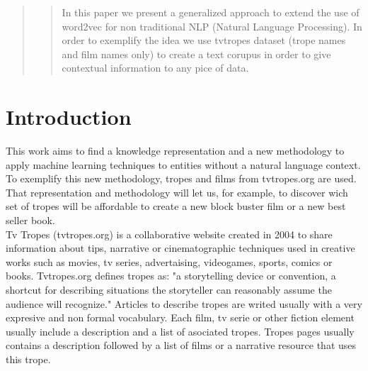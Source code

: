 \documentclass[letterpaper]{article}
\begin{document}
 
	\begin{abstract}
		\begin{quote}
			In this paper we present a generalized approach to extend the use of word2vec for non traditional NLP (Natural Language Processing). In order to exemplify the idea we use tvtropes dataset (trope names and film names only) to create a text corupus in order to give contextual information to any pice of data.
		\end{quote}
	\end{abstract}
	
	
	
	
	
	\section{Introduction}
	
	
	This work aims to find a knowledge representation and a new methodology to apply machine learning techniques to entities without a natural language context. To exemplify this new methodology, tropes and films from tvtropes.org are used. That representation and methodology will let us, for example, to discover wich set of tropes will be affordable to create a new block buster film or a new best seller book.   \\
	
	Tv Tropes (tvtropes.org) is a collaborative website created in 2004 to share information about tips, narrative or cinematographic techniques used in creative works such as movies, tv series, advertaising, videogames, sports, comics or books. Tvtropes.org defines tropes as: "a storytelling device or convention, a shortcut for describing situations the storyteller can reasonably assume the audience will recognize." Articles to describe tropes are writed usually with a very expresive and non formal vocabulary. Each film, tv serie or other fiction element usually include a description and a list of asociated tropes. Tropes pages usually contains a description followed by a list of films or a narrative resource that uses this trope.\\
	
\end{document}
